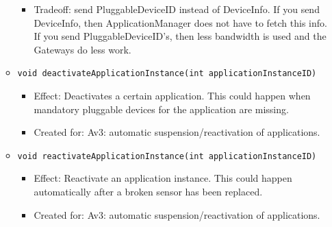 \begin{itemize}
\begin{itemize}
\begin{itemize}
                        \item Tradeoff: send PluggableDeviceID instead of DeviceInfo.
                              If you send DeviceInfo, then ApplicationManager does
                              not have to fetch this info.
                              If you send PluggableDeviceID's, then less bandwidth
                              is used and the Gateways do less work.
                    \end{itemize}
                \item \texttt{void deactivateApplicationInstance(int applicationInstanceID)}
                    \begin{itemize}
                        \item Effect: Deactivates a certain application. This could happen when
                              mandatory pluggable devices for the application are missing.
                        \item Created for: Av3: automatic suspension/reactivation of applications.
                    \end{itemize}
                \item \texttt{void reactivateApplicationInstance(int applicationInstanceID)}
                    \begin{itemize}
                        \item Effect: Reactivate an application instance. This could happen
                                      automatically after a broken sensor has been replaced.
                        \item Created for: Av3: automatic suspension/reactivation of applications.
                    \end{itemize}
            \end{itemize}


\end{itemize}
